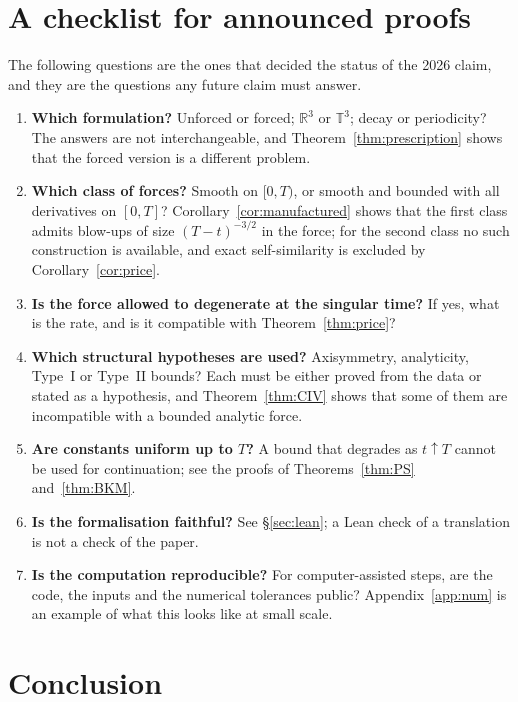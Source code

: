 \documentclass[11pt]{article}
\theoremstyle{remark}
\newcommand{\R}{\mathbb{R}}
\newcommand{\T}{\mathbb{T}}
\begin{document}
\section{A checklist for announced proofs}\label{sec:referee}

The following questions are the ones that decided the status of the 2026 claim, and they are
the questions any future claim must answer.

\begin{enumerate}[label=\textbf{Q\arabic*.},leftmargin=*]
\item \textbf{Which formulation?} Unforced or forced; $\R^3$ or $\T^3$; decay or periodicity?
      The answers are not interchangeable, and Theorem~\ref{thm:prescription} shows that the
      forced version is a different problem.
\item \textbf{Which class of forces?} Smooth on $[0,T)$, or smooth and bounded with all
      derivatives on $[0,T]$? Corollary~\ref{cor:manufactured} shows that the first class
      admits blow-ups of size $(T-t)^{-3/2}$ in the force; for the second class no such
      construction is available, and exact self-similarity is excluded by
      Corollary~\ref{cor:price}.
\item \textbf{Is the force allowed to degenerate at the singular time?} If yes, what is the
      rate, and is it compatible with Theorem~\ref{thm:price}?
\item \textbf{Which structural hypotheses are used?} Axisymmetry, analyticity, Type~I or
      Type~II bounds? Each must be either proved from the data or stated as a hypothesis, and
      Theorem~\ref{thm:CIV} shows that some of them are incompatible with a bounded analytic
      force.
\item \textbf{Are constants uniform up to $T$?} A bound that degrades as $t\uparrow T$ cannot
      be used for continuation; see the proofs of Theorems~\ref{thm:PS} and~\ref{thm:BKM}.
\item \textbf{Is the formalisation faithful?} See \S\ref{sec:lean}; a Lean check of a
      translation is not a check of the paper.
\item \textbf{Is the computation reproducible?} For computer-assisted steps, are the code,
      the inputs and the numerical tolerances public? Appendix~\ref{app:num} is an example of
      what this looks like at small scale.
\end{enumerate}

\section{Conclusion}\label{sec:conclusion}
\end{document}
